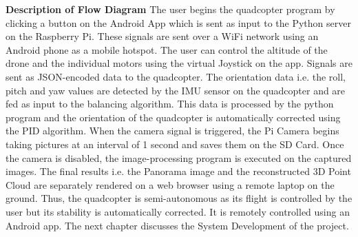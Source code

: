 \noindent
\textbf{Description of Flow Diagram}
\newline
The user begins the quadcopter program by clicking a button on the Android App which is sent as input to the Python server on the Raspberry Pi. These signals are sent over a WiFi network using an Android phone as a mobile hotspot. The user can control the altitude of the drone and the individual motors using the virtual Joystick on the app. Signals are sent as JSON-encoded data to the quadcopter. The orientation data i.e. the roll, pitch and yaw values are detected by the IMU sensor on the quadcopter and are fed as input to the balancing algorithm. This data is processed by the python program and the orientation of the quadcopter is automatically corrected using the PID algorithm. 
\newline
\newline
When the camera signal is triggered, the Pi Camera begins taking pictures at an interval of 1 second and saves them on the SD Card. Once the camera is disabled, the image-processing program is executed on the captured images. The final results i.e. the Panorama image and the reconstructed 3D Point Cloud are separately rendered on a web browser using a remote laptop on the ground. Thus, the quadcopter is semi-autonomous as its flight is controlled by the user but its stability is automatically corrected. It is remotely controlled using an Android app.
\newline
\newline
The next chapter discusses the System Development of the project.



